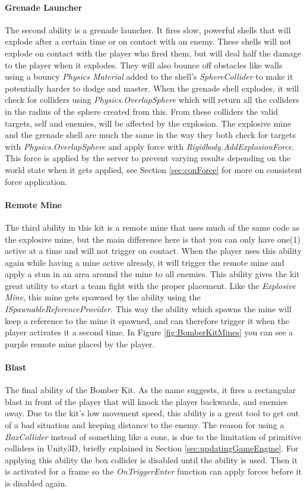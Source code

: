 \paragraph{Grenade Launcher}
The second ability is a grenade launcher. It fires slow, powerful shells that will explode after a certain time or on contact with an enemy. These shells will not explode on contact with the player who fired them, but will deal half the damage to the player when it explodes. They will also bounce off obstacles like walls using a bouncy \emph{Physics Material} added to the shell's \emph{SphereCollider} to make it potentially harder to dodge and master. When the grenade shell explodes, it will check for colliders using \emph{Physics.OverlapSphere} which will return all the colliders in the radius of the sphere created from this. From these colliders the valid targets, self and enemies, will be affected by the explosion. The explosive mine and the grenade shell are much the same in the way they both check for targets with \emph{Physics.OverlapSphere} and apply force with \emph{Rigidbody.AddExplosionForce}. This force is applied by the server to prevent varying results depending on the world state when it gets applied, see Section \ref{sec:conForce} for more on consistent force application.

\paragraph{Remote Mine}
The third ability in this kit is a remote mine that uses much of the same code as the explosive mine, but the main difference here is that you can only have one(1) active at a time and will not trigger on contact. When the player uses this ability again while having a mine active already, it will trigger the remote mine and apply a stun in an area around the mine to all enemies. This ability gives the kit great utility to start a team fight with the proper placement. Like the \emph{Explosive Mine}, this mine gets spawned by the ability using the \emph{ISpawnableReferenceProvider}. This way the ability which spawns the mine will keep a reference to the mine it spawned, and can therefore trigger it when the player activates it a second time. In Figure \ref{fig:BomberKitMines} you can see a purple remote mine placed by the player.

\paragraph{Blast}
The final ability of the Bomber Kit. As the name suggests, it fires a rectangular blast in front of the player that will knock the player backwards, and enemies away. Due to the kit's low movement speed, this ability is a great tool to get out of a bad situation and keeping distance to the enemy. The reason for using a \emph{BoxCollider} instead of something like a cone, is due to the limitation of primitive colliders in Unity3D, briefly explained in Section \ref{sec:updatingGameEngine}. For applying this ability the box collider is disabled until the ability is used. Then it is activated for a frame so the \emph{OnTriggerEnter} function can apply forces before it is disabled again.

